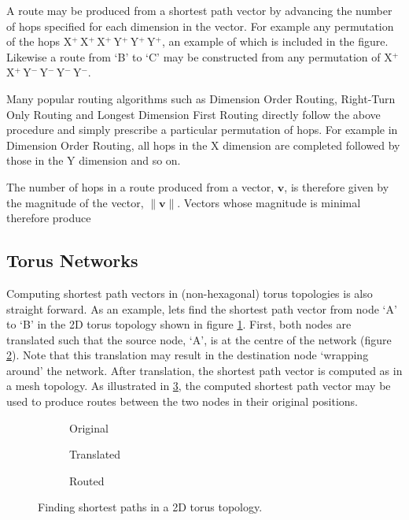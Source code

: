 		A route may be produced from a shortest path vector by advancing the number
		of hops specified for each dimension in the vector. For example any
		permutation of the hops X$^+\,$X$^+\,$X$^+\,$Y$^+\,$Y$^+\,$Y$^+$, an
		example of which is included in the figure. Likewise a route from `B' to
		`C' may be constructed from any permutation of
		X$^+\,$X$^+\,$Y$^-\,$Y$^-\,$Y$^-\,$Y$^-$.
		
		Many popular routing algorithms such as Dimension Order Routing, Right-Turn
		Only Routing and Longest Dimension First Routing \cite{dally04,davies12}
		directly follow the above procedure and simply prescribe a particular
		permutation of hops. For example in Dimension Order Routing, all hops in
		the X dimension are completed followed by those in the Y dimension and so
		on.
		
		The number of hops in a route produced from a vector, $\mathbf{v}$, is
		therefore given by the magnitude of the vector, $\|\mathbf{v}\|$.
		Vectors whose magnitude is minimal therefore produce 
		
		\subsection{Torus Networks}
			
			Computing shortest path vectors in (non-hexagonal) torus topologies is
			also straight forward. As an example, lets find the shortest path vector
			from node `A' to `B' in the 2D torus topology shown in figure
			\ref{fig:torus-shortest-path-example}. First, both nodes are translated
			such that the source node, `A', is at the centre of the network (figure
			\ref{fig:torus-shortest-path-translate}). Note that this translation may
			result in the destination node `wrapping around' the network. After
			translation, the shortest path vector is computed as in a mesh topology.
			As illustrated in \ref{fig:torus-shortest-path-routed}, the computed
			shortest path vector may be used to produce routes between the two nodes
			in their original positions.
			
			\begin{figure}
				\center
				\begin{subfigure}{0.3\linewidth}
					\center
					\caption{Original}
					\label{fig:torus-shortest-path-example}
				\end{subfigure}
				\begin{subfigure}{0.3\linewidth}
					\center
					\caption{Translated}
					\label{fig:torus-shortest-path-translate}
				\end{subfigure}
				\begin{subfigure}{0.3\linewidth}
					\center
					\caption{Routed}
					\label{fig:torus-shortest-path-routed}
				\end{subfigure}
				
				\caption{Finding shortest paths in a 2D torus topology.}
				\label{fig:torus-shortest-path}
			\end{figure}
			

